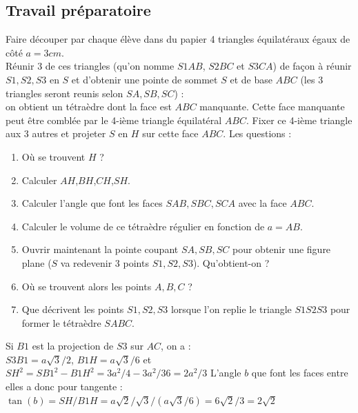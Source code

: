 \documentclass[a4paper,11pt]{book}
\begin{document}
\subsection{Travail pr\'eparatoire}
Faire d\'ecouper par chaque \'el\`eve dans du papier 4 triangles 
\'equilat\'eraux \'egaux de c\^ot\'e $a=3cm$.\\
 R\'eunir 3 de ces triangles (qu'on nomme $S1AB$, $S2BC$
et $S3CA$) de fa\c{c}on \`a r\'eunir $S1,S2,S3$ en $S$ et d'obtenir une 
pointe de sommet $S$ et de base $ABC$ (les 3 triangles seront reunis selon 
$SA,SB,SC$) :\\
on obtient un t\'etra\`edre dont la face est $ABC$ manquante. Cette face 
manquante peut \^etre combl\'ee par le 4-i\`eme triangle \'equilat\'eral $ABC$. 
Fixer ce 4-i\`eme triangle aux 3 autres et projeter $S$ en $H$ sur cette face 
$ABC$. 
Les questions :\\
\begin{enumerate}
\item O\`u se trouvent $H$ ?
\item Calculer $AH$,$BH$,$CH$,$SH$.
\item Calculer l'angle que font les faces $SAB,SBC,SCA$ avec la face $ABC$.
\item Calculer le volume de ce t\'etra\`edre r\'egulier en fonction de $a=AB$.
\item Ouvrir maintenant la pointe coupant $SA,SB,SC$ pour obtenir une figure 
plane ($S$ va redevenir 3 points $S1,S2,S3$). Qu'obtient-on ?
\item O\`u se trouvent alors les points $A, B, C$ ?
\item Que d\'ecrivent les points $S1,S2,S3$ lorsque l'on replie le triangle 
$S1S2S3$ pour former le t\'etra\`edre $SABC$.
\end{enumerate}

Si $B1$ est la projection de $S3$ sur $AC$, on a :\\
$S3B1=a\sqrt 3/2$, $B1H=a\sqrt 3/6$ et \\
$SH^2=SB1^2-B1H^2=3a^2/4-3a^2/36=2a^2/3$
L'angle $b$ que font les faces entre elles a donc pour tangente :\\
$\tan(b)=SH/B1H=a\sqrt 2/\sqrt 3/(a\sqrt 3/6)=6\sqrt 2/3=2\sqrt 2$
\end{document}

